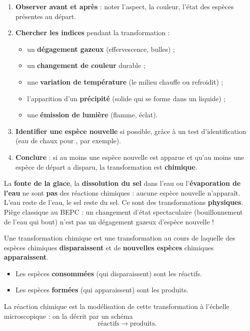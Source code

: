 \documentclass[11pt]{article}
\newcommand{\cle}[1]{{\popxbold\color{popdark}#1}}
\newcounter{popsec}
\newcounter{popsub}
\newcommand{\courssub}[1]{%
  \stepcounter{popsub}%
  \par\vspace{9pt}\noindent{\popxbold\fontsize{11.5}{13}\selectfont\color{popink}{\color{poporange}\thepopsec.\thepopsub}\hspace{6pt}#1}\par\nopagebreak\vspace{4pt}
}
\begin{document}
\begin{methode}
\begin{enumerate}
\item \textbf{Observer avant et après} : noter l'aspect, la couleur, l'état des espèces présentes au départ.
\item \textbf{Chercher les indices} pendant la transformation :
\begin{itemize}
\item un \textbf{dégagement gazeux} (effervescence, bulles) ;
\item un \textbf{changement de couleur} durable ;
\item une \textbf{variation de température} (le milieu chauffe ou refroidit) ;
\item l'apparition d'un \textbf{précipité} (solide qui se forme dans un liquide) ;
\item une \textbf{émission de lumière} (flamme, éclat).
\end{itemize}
\item \textbf{Identifier une espèce nouvelle} si possible, grâce à un test d'identification (eau de chaux pour , par exemple).
\item \textbf{Conclure} : si au moins une espèce nouvelle est apparue et qu'au moins une espèce de départ a disparu, la transformation est \textbf{chimique}.
\end{enumerate}
\end{methode}

\begin{attention}
La \textbf{fonte de la glace}, la \textbf{dissolution du sel} dans l'eau ou l'\textbf{évaporation de l'eau} ne sont \textbf{pas} des réactions chimiques : aucune espèce nouvelle n'apparaît. L'eau reste de l'eau, le sel reste du sel. Ce sont des transformations \textbf{physiques}. Piège classique au BEPC : un changement d'état spectaculaire (bouillonnement de l'eau qui bout) n'est pas un dégagement gazeux d'espèce nouvelle !
\end{attention}

\courssub{Définition et vocabulaire}

\begin{definition}
Une \cle{transformation chimique} est une transformation au cours de laquelle des espèces chimiques \textbf{disparaissent} et de \textbf{nouvelles espèces} chimiques \textbf{apparaissent}.
\begin{itemize}
\item Les espèces \textbf{consommées} (qui disparaissent) sont les \cle{réactifs}.
\item Les espèces \textbf{formées} (qui apparaissent) sont les \cle{produits}.
\end{itemize}
La \cle{réaction chimique} est la modélisation de cette transformation à l'échelle microscopique : on la décrit par un schéma
\[ \text{réactifs} \longrightarrow \text{produits}. \]
\end{definition}
\end{document}
